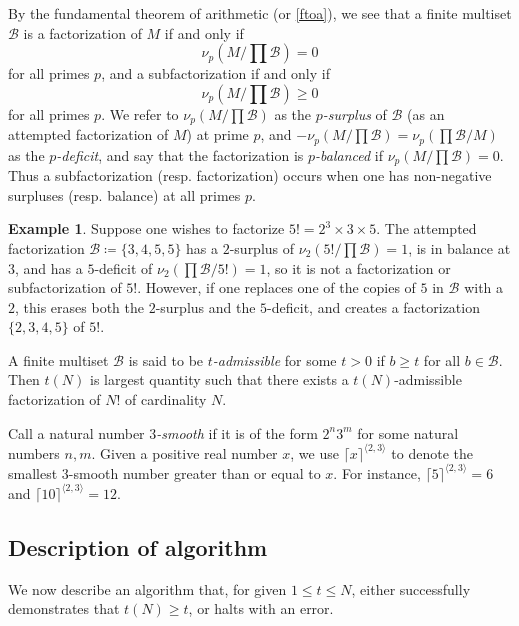 \documentclass[12pt,a4paper,reqno]{amsart}
\numberwithin{equation}{section}
\theoremstyle{plain}
\theoremstyle{definition}
\newtheorem{example}[theorem]{Example}
\newcommand\tuple{{\mathcal B}}
\begin{document}
By the fundamental theorem of arithmetic (or \eqref{ftoa}), we see that a finite multiset $\tuple$ is a factorization of $M$ if and only if
$$ \nu_p( M / \prod \tuple ) = 0$$
for all primes $p$, and a subfactorization if and only if
$$ \nu_p( M / \prod \tuple ) \geq 0$$
for all primes $p$.  We refer to $\nu_p( M / \prod \tuple )$ as the \emph{$p$-surplus} of $\tuple$ (as an attempted factorization of $M$) at prime $p$, and $-\nu_p(M/\prod\tuple) = \nu_p(\prod\tuple/M)$ as the \emph{$p$-deficit}, and say that the factorization is \emph{$p$-balanced} if $\nu_p(M/\prod \tuple)=0$.  Thus a subfactorization (resp. factorization) occurs when one has non-negative surpluses (resp. balance) at all primes $p$.

\begin{example} Suppose one wishes to factorize $5! = 2^3 \times 3 \times 5$.  The attempted factorization ${\mathcal B} \coloneqq \{3,4,5,5\}$ has a $2$-surplus of $\nu_2(5!/\prod {\mathcal B}) = 1$, is in balance at $3$, and has a $5$-deficit of $\nu_2(\prod {\mathcal B}/5!) = 1$, so it is not a factorization or subfactorization of $5!$.  However, if one replaces one of the copies of $5$ in ${\mathcal B}$ with a $2$, this erases both the $2$-surplus and the $5$-deficit, and creates a factorization $\{2,3,4,5\}$ of $5!$.
\end{example}



A finite multiset $\tuple$ is said to be \emph{$t$-admissible} for some $t>0$ if $b \geq t$ for all $b \in \tuple$.  Then $t(N)$ is largest quantity such that there exists a $t(N)$-admissible factorization of $N!$ of cardinality $N$.  

Call a natural number \emph{$3$-smooth} if it is of the form $2^n 3^m$ for some natural numbers $n,m$.  Given a positive real number $x$, we use $\lceil x \rceil^{\langle 2,3 \rangle}$ to denote the smallest $3$-smooth number greater than or equal to $x$.  For instance, $\lceil 5 \rceil^{\langle 2,3 \rangle} = 6$ and $\lceil 10 \rceil^{\langle 2,3 \rangle} = 12$.

\subsection{Description of algorithm}\label{alg-desc}

We now describe an algorithm that, for given $1 \leq t \leq N$, either successfully demonstrates that $t(N) \geq t$, or halts with an error.
\end{document}
